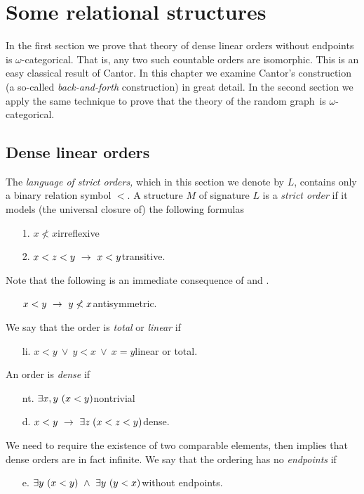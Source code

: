 \chapter{Some relational structures}
\label{relational}

\def\ceq#1#2#3{\parbox[b]{20ex}{$\displaystyle #1$}\parbox[b]{4ex}{\hfil$#2$}$\displaystyle #3$}

In the first section we prove that theory of dense linear orders without endpoints is $\omega$-cate\-gorical.
That is, any two such countable orders are isomorphic.
This is an easy classical result of Cantor.
In this chapter we examine Cantor's construction (a so-called \textit{back-and-forth\/} construction) in great detail.
In the second section we apply the same technique to prove that the theory of the random graph\ is $\omega$-categorical.

\section{Dense linear orders}
\label{dlo}
The \emph{language of strict orders,} which in this section we denote by $L$, contains only a binary relation symbol $<$.
A structure $M$ of signature $L$ is a \emph{strict order\/} if it models (the universal closure of) the following formulas
\begin{itemize}
\item[1.] $x \not< x$\hfill irreflexive
\item[2.] $x< z< y\ \rightarrow\ x< y$\hfill transitive.
\end{itemize}
Note that the following is an immediate consequence of  and .
\begin{itemize}
\item[] $x<y\ \imp\ y\not<x$\hfill antisymmetric.
\end{itemize}
We say that the order is \emph{total\/} or \emph{linear\/} if
\begin{itemize}
\item[li.] $x< y\ \vee\ y< x\ \vee\ x=y$\hfill linear or total.
\end{itemize}
An order is \emph{dense\/} if
\begin{itemize}
\item[nt.]  $\exists x,y\ (x<y)$\hfill nontrivial
\item[d.] $x<y\ \rightarrow\ \exists z\;(x<z<y)$\hfill dense.
\end{itemize}
We need to require the existence of two comparable elements, then  implies that dense orders are in fact infinite.
We say that the ordering has no \emph{endpoints\/} if
\begin{itemize}
\item[e.] $\exists y\ (x<y)\ \wedge\ \exists y\ (y<x)$\hfill without endpoints.
\end{itemize}

